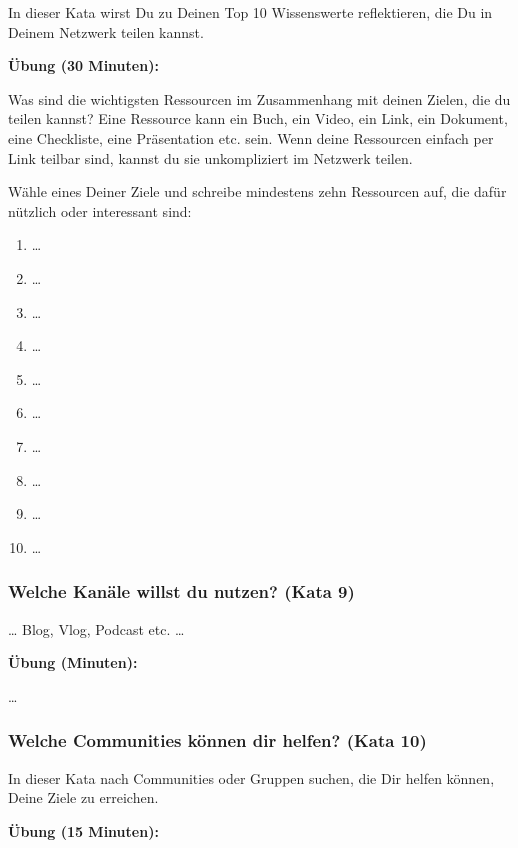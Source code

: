 \documentclass[
  ngerman,
  paper=a4,
,captions=tableheading
]{scrartcl}
\providecommand{\tightlist}{%
  \setlength{\itemsep}{0pt}\setlength{\parskip}{0pt}}
\begin{document}
In dieser Kata wirst Du zu Deinen Top 10 Wissenswerte reflektieren, die
Du in Deinem Netzwerk teilen kannst.

\textbf{Übung (30 Minuten):}

Was sind die wichtigsten Ressourcen im Zusammenhang mit deinen Zielen,
die du teilen kannst? Eine Ressource kann ein Buch, ein Video, ein Link,
ein Dokument, eine Checkliste, eine Präsentation etc. sein. Wenn deine
Ressourcen einfach per Link teilbar sind, kannst du sie unkompliziert im
Netzwerk teilen.

Wähle eines Deiner Ziele und schreibe mindestens zehn Ressourcen auf,
die dafür nützlich oder interessant sind:

\begin{enumerate}
\def\labelenumi{\arabic{enumi}.}
\tightlist
\item
  \ldots{}
\item
  \ldots{}
\item
  \ldots{}
\item
  \ldots{}
\item
  \ldots{}
\item
  \ldots{}
\item
  \ldots{}
\item
  \ldots{}
\item
  \ldots{}
\item
  \ldots{}
\end{enumerate}

\hypertarget{welche-kanuxe4le-willst-du-nutzen-kata-9}{%
\subsubsection{Welche Kanäle willst du nutzen? (Kata
9)}\label{welche-kanuxe4le-willst-du-nutzen-kata-9}}

\ldots{} Blog, Vlog, Podcast etc. \ldots{}

\textbf{Übung (Minuten):}

\ldots{}

\hypertarget{welche-communities-kuxf6nnen-dir-helfen-kata-10}{%
\subsubsection{Welche Communities können dir helfen? (Kata
10)}\label{welche-communities-kuxf6nnen-dir-helfen-kata-10}}

In dieser Kata nach Communities oder Gruppen suchen, die Dir helfen
können, Deine Ziele zu erreichen.

\textbf{Übung (15 Minuten):}
\end{document}
